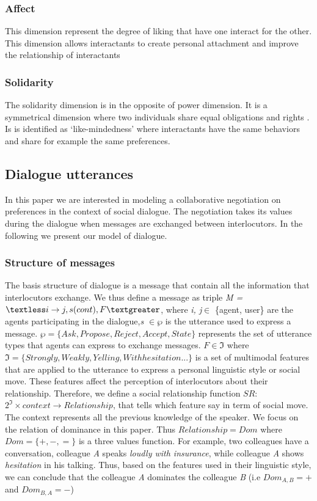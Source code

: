 \documentclass{llncs}
\begin{document}
\subsubsection{Affect}
This dimension represent the degree of liking that have one interact for the other. This dimension allows interactants to create personal attachment and improve the relationship of interactants \cite{nicholson2001role}
\subsubsection{Solidarity}
The solidarity dimension is in the opposite of power dimension. It is a symmetrical dimension where two individuals share equal obligations and rights \cite{svennevig2000getting}. Is is identified as ‘like-mindedness’ \cite{bickmore2005establishing} where interactants have the same behaviors and share for example the same preferences.
\subsection{Dialogue utterances}
In this paper we are interested in  modeling a collaborative negotiation on preferences in the context of social dialogue. The negotiation takes its values during the dialogue when messages are exchanged between interlocutors. In the following we present our model of dialogue.
\subsubsection{Structure of messages}
The basis structure of dialogue is a message that contain all the information that interlocutors exchange. We thus define a message as triple \emph{M = $\textless i \rightarrow j, s(cont), F  \textgreater$}, where \emph{i, j}$\in$ \{agent, user\} are the agents participating in the dialogue,\emph{s $\in \wp$}  is the utterance used to express a message. $\wp = \{ Ask, Propose, Reject, Accept, State\}$  represents the set of utterance types \cite{searle1969speech} that agents can express to exchange messages. 
 $F \in \Im $  where $\Im = \{ Strongly, Weakly, Yelling, With hesitation ...\}$ is a set of multimodal features that are applied to the utterance to express a personal linguistic style or social move. These features affect the perception of interlocutors about their relationship. Therefore, we define a social relationship function $SR$: $2^\Im  \times context \rightarrow Relationship $, that tells which feature say in term of social move. The context represents all the previous knowledge of the speaker. We focus on the relation of dominance in this paper. Thus $Relationship = Dom$ where  $Dom = \{+, -, =\}$ is a three values function. For example, two colleagues have a conversation, colleague \emph{A} speaks \textit{loudly with insurance}, while colleague \emph{A} shows \textit{hesitation} in his talking. Thus, based on the features used in their linguistic style, we can conclude that the colleague \emph{A}  dominates  the colleague \emph{B} (i.e $Dom_{A,B} = +$ and $Dom_{B,A} = -$)
 
\end{document}
